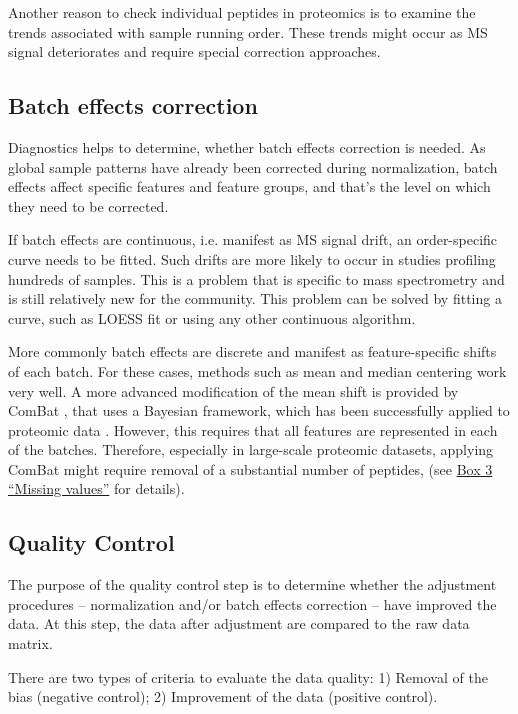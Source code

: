 \documentclass[num-refs]{wiley-article}
\begin{document}
Another reason to check individual peptides in proteomics is to examine the trends associated with sample running order. These trends might occur as MS signal deteriorates and require special correction approaches.

\subsection{Batch effects correction}

Diagnostics helps to determine, whether batch effects correction is needed. As global sample patterns have already been corrected during normalization, batch effects affect specific features and feature groups, and that’s the level on which they need to be corrected.

If batch effects are continuous, i.e. manifest as MS signal drift, an order-specific curve needs to be fitted. Such drifts are more likely to occur in studies profiling hundreds of samples. This is a problem that is specific to mass spectrometry and is still relatively new for the community. This problem can be solved by fitting a curve, such as LOESS fit or using any other continuous algorithm.

More commonly batch effects are discrete and manifest as feature-specific shifts of each batch. For these cases, methods such as mean and median centering work very well. A more advanced modification of the mean shift is provided by ComBat \cite{Johnson:2007aa}, that uses a Bayesian framework, which has been successfully applied to proteomic data \cite{Lee:2019aa}. However, this requires that all features are represented in each of the batches. Therefore, especially in large-scale proteomic datasets, applying ComBat might require removal of  a substantial number of peptides, (see \hyperref[box:Box3_missingness]{Box 3 “Missing values”} for details).

\subsection{Quality Control}

The purpose of the quality control step is to determine whether the adjustment procedures – normalization and/or batch effects correction – have improved the data. At this step, the data after adjustment are compared to the raw data matrix.

There are two types of criteria to evaluate the data quality: 1) Removal of the bias (negative control); 2) Improvement of the data (positive control).
\end{document}
